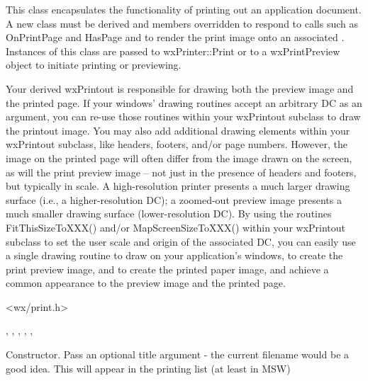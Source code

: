 This class encapsulates the functionality of printing out an application
document. A new class must be derived and members overridden to respond to calls
such as OnPrintPage and HasPage and to render the print image onto an associated
. Instances of this class are passed to wxPrinter::Print or
to a wxPrintPreview object to initiate printing or previewing.

Your derived wxPrintout is responsible for drawing both the preview image and
the printed page. If your windows' drawing routines accept an arbitrary DC as an
argument, you can re-use those routines within your wxPrintout subclass to draw
the printout image. You may also add additional drawing elements within your
wxPrintout subclass, like headers, footers, and/or page numbers. However, the
image on the printed page will often differ from the image drawn on the screen,
as will the print preview image -- not just in the presence of headers and
footers, but typically in scale. A high-resolution printer presents a much
larger drawing surface (i.e., a higher-resolution DC); a zoomed-out preview
image presents a much smaller drawing surface (lower-resolution DC). By using
the routines FitThisSizeToXXX() and/or MapScreenSizeToXXX() within your
wxPrintout subclass to set the user scale and origin of the associated DC, you
can easily use a single drawing routine to draw on your application's windows,
to create the print preview image, and to create the printed paper image, and
achieve a common appearance to the preview image and the printed page.





<wx/print.h>


, 
, 
, 
, 
, 



\label{wxprintoutctor}


Constructor. Pass an optional title argument - the current filename would be a good idea. This will appear in the printing list
(at least in MSW)


